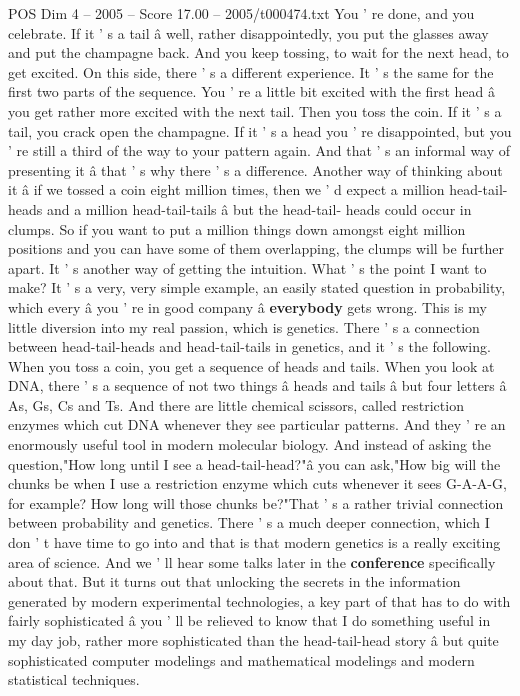 \begin{textsample}{POS Dim 4 – 2005 – Score 17.00 – 2005/t000474.txt}
You ' re done, and you celebrate.
If it ' s a tail â well, rather disappointedly, you put the glasses away and put the champagne back.
And you keep tossing, to wait for the next head, to get excited.
On this side, there ' s a different experience.
It ' s the same for the first two parts of the sequence.
You ' re a little bit excited with the first head â you get rather more excited with the next tail.
Then you toss the coin.
If it ' s a tail, you crack open the champagne.
If it ' s a head you ' re disappointed, but you ' re still a third of the way to your pattern again.
And that ' s an informal way of presenting it â that ' s why there ' s a difference.
Another way of thinking about it â if we tossed a coin eight million times, then we ' d expect a million head-tail-heads and a million head-tail-tails â but the head-tail- heads could occur in clumps.
So if you want to put a million things down amongst eight million positions and you can have some of them overlapping, the clumps will be further apart.
It ' s another way of getting the intuition.
What ' s the point I want to make?
It ' s a very, very simple example, an easily stated question in probability, which every â you ' re in good company â \textbf{everybody} gets wrong.
This is my little diversion into my real passion, which is genetics.
There ' s a connection between head-tail-heads and head-tail-tails in genetics, and it ' s the following.
When you toss a coin, you get a sequence of heads and tails.
When you look at DNA, there ' s a sequence of not two things â heads and tails â but four letters â As, Gs, Cs and Ts.
And there are little chemical scissors, called restriction enzymes which cut DNA whenever they see particular patterns.
And they ' re an enormously useful tool in modern molecular biology.
And instead of asking the question,"How long until I see a head-tail-head?"â you can ask,"How big will the chunks be when I use a restriction enzyme which cuts whenever it sees G-A-A-G, for example?
How long will those chunks be?"That ' s a rather trivial connection between probability and genetics.
There ' s a much deeper connection, which I don ' t have time to go into and that is that modern genetics is a really exciting area of science.
And we ' ll hear some talks later in the \textbf{conference} specifically about that.
But it turns out that unlocking the secrets in the information generated by modern experimental technologies, a key part of that has to do with fairly sophisticated â you ' ll be relieved to know that I do something useful in my day job, rather more sophisticated than the head-tail-head story â but quite sophisticated computer modelings and mathematical modelings and modern statistical techniques.

\end{textsample}
